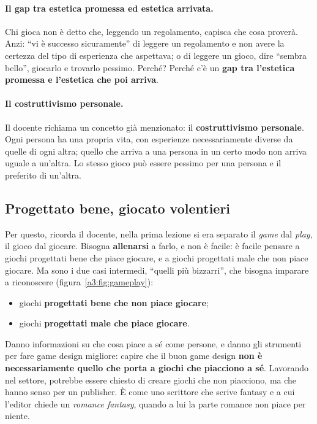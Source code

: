 \paragraph{Il gap tra estetica promessa ed estetica arrivata.} Chi gioca non è
detto che, leggendo un regolamento, capisca che cosa proverà. Anzi: ``vi è
successo sicuramente'' di leggere un regolamento e non avere la certezza del
tipo di esperienza che aspettava; o di leggere un gioco, dire ``sembra bello'',
giocarlo e trovarlo pessimo. Perché? Perché c'è un \textbf{gap tra l'estetica
promessa e l'estetica che poi arriva}.

\paragraph{Il costruttivismo personale.} Il docente richiama un concetto già
menzionato: il \textbf{costruttivismo personale}. Ogni persona ha una propria
vita, con esperienze necessariamente diverse da quelle di ogni altra; quello che
arriva a una persona in un certo modo non arriva uguale a un'altra. Lo stesso
gioco può essere pessimo per una persona e il preferito di un'altra.

\subsection{Progettato bene, giocato volentieri}

Per questo, ricorda il docente, nella prima lezione si era separato il
\emph{game} dal \emph{play}, il gioco dal giocare. Bisogna \textbf{allenarsi} a
farlo, e non è facile: è facile pensare a giochi progettati bene che piace
giocare, e a giochi progettati male che non piace giocare. Ma sono i due casi
intermedi, ``quelli più bizzarri'', che bisogna imparare a riconoscere
(figura~\ref{a3:fig:gameplay}):
\begin{itemize}
  \item giochi \textbf{progettati bene che non piace giocare};
  \item giochi \textbf{progettati male che piace giocare}.
\end{itemize}
Danno informazioni su che cosa piace a sé come persone, e danno gli strumenti
per fare game design migliore: capire che il buon game design \textbf{non è
necessariamente quello che porta a giochi che piacciono a sé}. Lavorando nel
settore, potrebbe essere chiesto di creare giochi che non piacciono, ma che
hanno senso per un publisher. È come uno scrittore che scrive fantasy e a cui
l'editor chiede un \emph{romance fantasy}, quando a lui la parte romance non
piace per niente.


